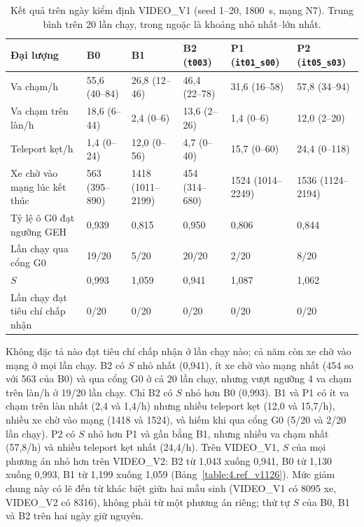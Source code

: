 \documentclass[../main.tex]{subfiles}
\begin{document}
\begin{table}[!htbp]
\centering
\small\setlength{\tabcolsep}{3pt}
\caption{Kết quả trên ngày kiểm định VIDEO\_V1 (seed 1--20, 1800~s, mạng N7). Trung bình trên 20 lần chạy, trong ngoặc là khoảng nhỏ nhất--lớn nhất.} \label{table:bench}
\begin{tabular}{|>{\raggedright\arraybackslash}p{2.9cm}|p{2.12cm}|p{2.12cm}|p{2.12cm}|p{2.12cm}|p{2.12cm}|}
\hline
\textbf{Đại lượng} & \textbf{B0} & \textbf{B1} & \textbf{B2 (\texttt{t003})} & \textbf{P1 (\texttt{it01\_s00})} & \textbf{P2 (\texttt{it05\_s03})} \\ \hline
Va chạm/h & 55,6 (40--84) & 26,8 (12--46) & 46,4 (22--78) & 31,6 (16--58) & 57,8 (34--94) \\ \hline
Va chạm trên làn/h & 18,6 (6--44) & 2,4 (0--6) & 13,6 (2--26) & 1,4 (0--6) & 12,0 (2--20) \\ \hline
Teleport kẹt/h & 1,4 (0--24) & 12,0 (0--56) & 4,7 (0--40) & 15,7 (0--60) & 24,4 (0--118) \\ \hline
Xe chờ vào mạng lúc kết thúc & 563 (395--890) & 1418 (1011--2199) & 454 (314--680) & 1524 (1014--2249) & 1536 (1124--2194) \\ \hline
Tỷ lệ ô G0 đạt ngưỡng GEH & 0,939 & 0,815 & 0,950 & 0,806 & 0,844 \\ \hline
Lần chạy qua cổng G0 & 19/20 & 5/20 & 20/20 & 2/20 & 8/20 \\ \hline
$S$ & 0,993 & 1,059 & 0,941 & 1,087 & 1,062 \\ \hline
Lần chạy đạt tiêu chí chấp nhận & 0/20 & 0/20 & 0/20 & 0/20 & 0/20 \\ \hline
\end{tabular}
\end{table}

Không đặc tả nào đạt tiêu chí chấp nhận ở lần chạy nào; cả năm còn xe chờ vào mạng ở mọi lần chạy. B2 có $S$ nhỏ nhất (0,941), ít xe chờ vào mạng nhất (454 so với 563 của B0) và qua cổng G0 ở cả 20 lần chạy, nhưng vượt ngưỡng 4 va chạm trên làn/h ở 19/20 lần chạy. Chỉ B2 có $S$ nhỏ hơn B0 (0,993). B1 và P1 có ít va chạm trên làn nhất (2,4 và 1,4/h) nhưng nhiều teleport kẹt (12,0 và 15,7/h), nhiều xe chờ vào mạng (1418 và 1524), và hiếm khi qua cổng G0 (5/20 và 2/20 lần chạy). P2 có $S$ nhỏ hơn P1 và gần bằng B1, nhưng nhiều va chạm nhất (57,8/h) và nhiều teleport kẹt nhất (24,4/h). Trên VIDEO\_V1, $S$ của mọi phương án nhỏ hơn trên VIDEO\_V2: B2 từ 1,043 xuống 0,941, B0 từ 1,130 xuống 0,993, B1 từ 1,199 xuống 1,059 (Bảng~\ref{table:4.ref_v1126}). Mức giảm chung này có lẽ đến từ khác biệt giữa hai mẫu sinh (VIDEO\_V1 có 8095 xe, VIDEO\_V2 có 8316), không phải từ một phương án riêng; thứ tự $S$ của B0, B1 và B2 trên hai ngày giữ nguyên.
\end{document}
